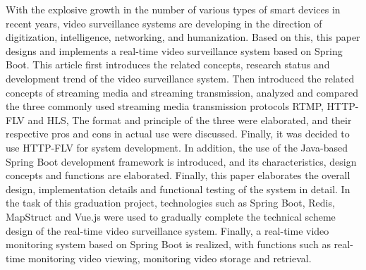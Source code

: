 \begin{enabstract}
  With the explosive growth in the number of various types of smart devices in recent years, 
  video surveillance systems are developing in the direction of digitization, intelligence,
   networking, and humanization.
  Based on this, this paper designs and implements a real-time video surveillance system based on Spring Boot.
  This article first introduces the related concepts, research status and development trend of 
  the video surveillance system.
  Then introduced the related concepts of streaming media and streaming transmission,
  analyzed and compared the three commonly used streaming media transmission protocols RTMP, HTTP-FLV and HLS,
   The format and principle of the three were elaborated, and their respective pros and cons in actual use were discussed.
    Finally, it was decided to use HTTP-FLV for system development.
    In addition, the use of the Java-based Spring Boot development framework is introduced, and its characteristics,
     design concepts and functions are elaborated.
     Finally, this paper elaborates the overall design, implementation details and functional testing of the system in detail.
  In the task of this graduation project, technologies such as Spring Boot, Redis,
   MapStruct and Vue.js were used to gradually complete the technical scheme design 
   of the real-time video surveillance system.
  Finally, a real-time video monitoring system based on Spring Boot is realized, 
  with functions such as real-time monitoring video viewing, monitoring video storage and retrieval.

\end{enabstract}
